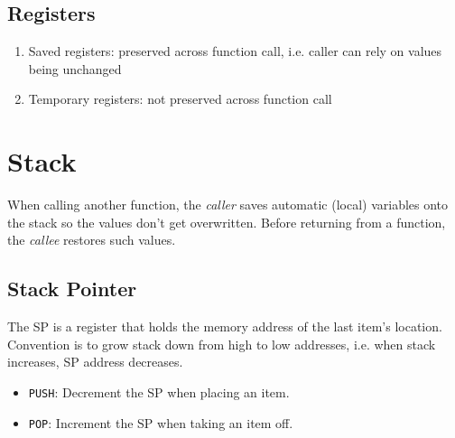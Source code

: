 \subsection{Registers}
\begin{enumerate}
    \item Saved registers: preserved across function call, i.e. caller can rely on values being unchanged
    \item Temporary registers: not preserved across function call  
\end{enumerate}

\section{Stack}
When calling another function, the \emph{caller} saves automatic (local) variables onto the stack so the values don't get overwritten. Before returning from a function, the \emph{callee} restores such values.

\subsection{Stack Pointer}
The SP is a register that holds the memory address of the last item's location. Convention is to grow stack down from high to low addresses, i.e. when stack increases, SP address decreases.
\begin{itemize}
    \item \texttt{PUSH}: Decrement the SP when placing an item.
    \item \texttt{POP}: Increment the SP when taking an item off.
\end{itemize}